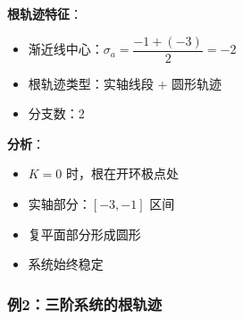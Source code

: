 \begin{tcolorbox}[colback=blue!5!white,colframe=blue!75!black,title=例1：二阶系统,boxsep=5pt,left=5pt,right=5pt,top=5pt,bottom=5pt]
\begin{minipage}[t]{0.45\textwidth}
\textbf{根轨迹特征}：
\begin{itemize}
    \item 渐近线中心：$\sigma_a = \dfrac{-1+(-3)}{2} = -2$
    \item 根轨迹类型：实轴线段 + 圆形轨迹
    \item 分支数：2
\end{itemize}

\textbf{分析}：
\begin{itemize}
    \item $K=0$ 时，根在开环极点处
    \item 实轴部分：$[-3, -1]$ 区间
    \item 复平面部分形成圆形
    \item 系统始终稳定
\end{itemize}

\end{minipage}

\end{tcolorbox}

\subsubsection{例2：三阶系统的根轨迹}

